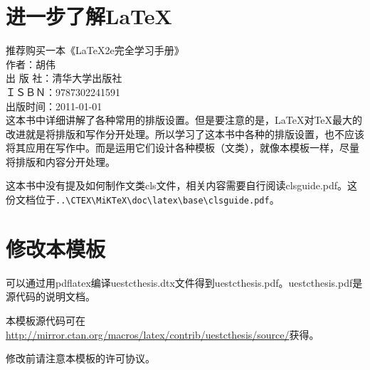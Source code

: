 \section{进一步了解\LaTeX}
推荐购买一本《LaTeX2e完全学习手册》\\
作者：胡伟\\
出 版 社：清华大学出版社\\
ＩＳＢＮ：9787302241591 \\
出版时间：2011-01-01\\

这本书中详细讲解了各种常用的排版设置。但是要注意的是，\LaTeX{}对\TeX{}最大的改进就是将排版和写作分开处理。所以学习了这本书中各种的排版设置，也不应该将其应用在写作中。而是运用它们设计各种模板（文类），就像本模板一样，尽量将排版和内容分开处理。

这本书中没有提及如何制作文类cls文件，相关内容需要自行阅读clsguide.pdf。这份文档位于\verb|..\CTEX\MiKTeX\doc\latex\base\clsguide.pdf|。

\section{修改本模板}
可以通过用pdflatex编译uestcthesis.dtx文件得到uestcthesis.pdf。uestcthesis.pdf是源代码的说明文档。

本模板源代码可在\url{http://mirror.ctan.org/macros/latex/contrib/uestcthesis/source/}获得。

修改前请注意本模板的许可协议。

